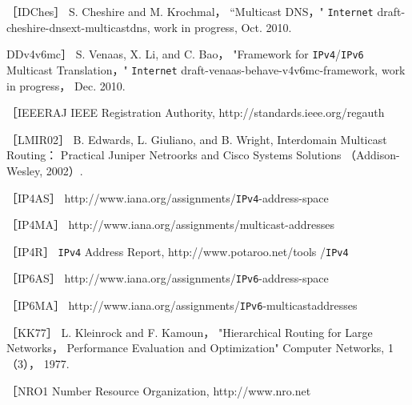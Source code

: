 ［IDChes］ S. Cheshire and M. Krochmal， “Multicast DNS，" \verb|Internet| draft-
cheshire-dnsext-multicastdns, work in progress, Oct. 2010.

DDv4v6mc］ S. Venaas, X. Li, and C. Bao， "Framework for \verb|IPv4|/\verb|IPv6| Multicast
Translation，" \verb|Internet| draft-venaas-behave-v4v6mc-framework, work in progress，
Dec. 2010.

［IEEERAJ IEEE Registration Authority, http://standards.ieee.org/regauth

［LMIR02］ B. Edwards, L. Giuliano, and B. Wright, Interdomain Multicast Routing：
Practical Juniper Netroorks and Cisco Systems Solutions （Addison-Wesley, 2002）.

［IP4AS］ http://www.iana.org/assignments/\verb|IPv4|-address-space

［IP4MA］ http://www.iana.org/assignments/multicast-addresses

［IP4R］ \verb|IPv4| Address Report, http://www.potaroo.net/tools /\verb|IPv4|

［IP6AS］ http://www.iana.org/assignments/\verb|IPv6|-address-space

［IP6MA］ http://www.iana.org/assignments/\verb|IPv6|-multicastaddresses

［KK77］ L. Kleinrock and F. Kamoun， "Hierarchical Routing for Large Networks，
Performance Evaluation and Optimization" Computer Networks, 1（3）， 1977.

［NRO1 Number Resource Organization, http://www.nro.net
